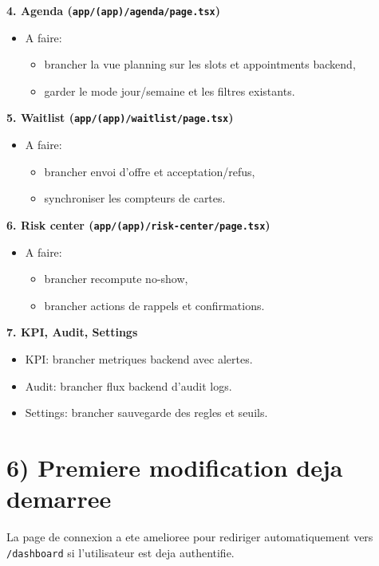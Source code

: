 \documentclass[11pt,a4paper]{article}
\begin{document}
\textbf{4. Agenda (\texttt{app/(app)/agenda/page.tsx})}
\begin{itemize}[leftmargin=*]
  \item A faire:
  \begin{itemize}
    \item brancher la vue planning sur les slots et appointments backend,
    \item garder le mode jour/semaine et les filtres existants.
  \end{itemize}
\end{itemize}

\textbf{5. Waitlist (\texttt{app/(app)/waitlist/page.tsx})}
\begin{itemize}[leftmargin=*]
  \item A faire:
  \begin{itemize}
    \item brancher envoi d'offre et acceptation/refus,
    \item synchroniser les compteurs de cartes.
  \end{itemize}
\end{itemize}

\textbf{6. Risk center (\texttt{app/(app)/risk-center/page.tsx})}
\begin{itemize}[leftmargin=*]
  \item A faire:
  \begin{itemize}
    \item brancher recompute no-show,
    \item brancher actions de rappels et confirmations.
  \end{itemize}
\end{itemize}

\textbf{7. KPI, Audit, Settings}
\begin{itemize}[leftmargin=*]
  \item KPI: brancher metriques backend avec alertes.
  \item Audit: brancher flux backend d'audit logs.
  \item Settings: brancher sauvegarde des regles et seuils.
\end{itemize}

\section*{6) Premiere modification deja demarree}
La page de connexion a ete amelioree pour rediriger automatiquement vers \texttt{/dashboard} si l'utilisateur est deja authentifie.
\end{document}
